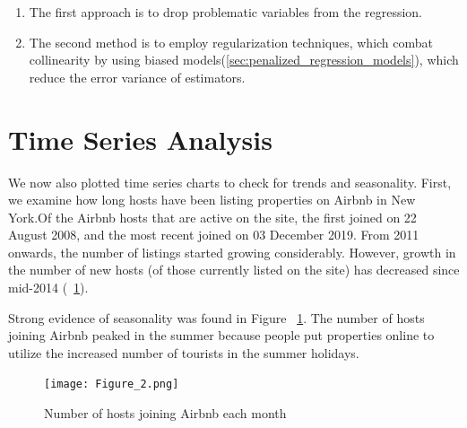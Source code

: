\begin{enumerate}
    \item The first approach is to drop problematic variables from the regression.
    \item The second method is to employ regularization techniques, which combat
        collinearity by using biased models(\ref{sec:penalized_regression_models}),
        which reduce the error variance of estimators.
\end{enumerate}

\section{Time Series Analysis}
\label{sec:time_series}

We now also plotted time series charts to check for trends and seasonality.
First, we examine how long hosts have been listing properties on Airbnb in New
York.Of the Airbnb hosts that are active on the site, the first joined on 22
August 2008, and the most recent joined on 03 December 2019.
From 2011 onwards, the number of listings started growing considerably. However,
growth in the number of new hosts (of those currently listed on the site) has
decreased since mid-2014 (~\ref{fig:number_of_hosts_joining}).

Strong evidence of seasonality was found in Figure
~\ref{fig:number_of_hosts_joining}. The number of hosts joining Airbnb peaked in
the summer because people put properties online to utilize the increased number
of tourists in the summer holidays.




\begin{figure}[H] \centering
    \texttt{[image: Figure\_2.png]}
    \caption{Number of hosts joining Airbnb each month}
    \label{fig:number_of_hosts_joining}
\end{figure}



